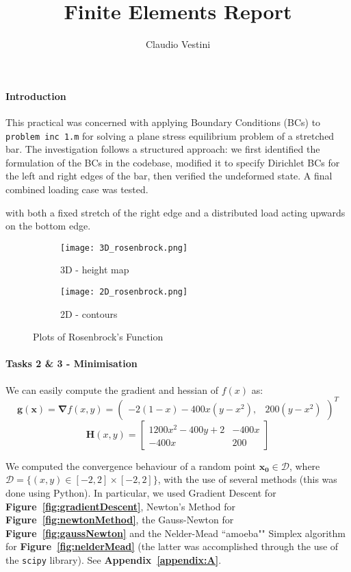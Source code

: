 \documentclass[hidelinks]{article}
\title{\vspace{-1cm} Finite Elements Report}
\author{\vspace{-2cm} Claudio Vestini}
\date{}
\begin{document}
\maketitle
%
\paragraph{Introduction}
This practical was concerned with applying Boundary Conditions (BCs) to \texttt{problem inc 1.m} for solving a plane stress equilibrium problem of a stretched bar.
The investigation follows a structured approach: we first identified the formulation of the BCs in the codebase, modified it to specify Dirichlet BCs for the left and right edges of the bar, then verified the undeformed state. A final combined loading case was tested.






with both a fixed stretch of the right edge and a distributed load acting upwards on the bottom edge.
%
\begin{figure}[h]
    \centering
    \begin{subfigure}[t]{0.49\textwidth}
        \centering
        \texttt{[image: 3D\_rosenbrock.png]}
        \caption{3D - height map}
        \label{fig:3Drosenbrock}
    \end{subfigure}
    \hfill
    \begin{subfigure}[t]{0.49\textwidth}
        \centering
        \texttt{[image: 2D\_rosenbrock.png]}
        \caption{2D - contours}
        \label{fig:2Drosenbrock}
    \end{subfigure}
    \caption{Plots of Rosenbrock's Function}
    \label{fig:functionPlots}
\end{figure}
%
\paragraph{Tasks 2 \& 3 - Minimisation}
We can easily compute the gradient and hessian of $f(x)$ as:
\[
\mathbf{g(\mathbf{x})} = \boldsymbol{\nabla} f(x, y) = 
\begin{pmatrix}
-2(1 - x) - 400x(y - x^2), & 200(y - x^2)
\end{pmatrix}^{T}
\]
\[
\mathbf{H}(x, y) =
\begin{bmatrix}
1200x^2 - 400y + 2 & -400x \\
-400x & 200
\end{bmatrix}
\]
\par We computed the convergence behaviour of a random point $\mathbf{x_0} \in \mathcal{D}$, where $\mathcal{D} = \{ (x, y) \in [-2, 2] \times [-2, 2] \}$, with the use of several methods (this was done using Python). In particular, we used Gradient Descent for \textbf{Figure~\ref{fig:gradientDescent}}, Newton's Method for \textbf{Figure~\ref{fig:newtonMethod}}, the Gauss-Newton for \textbf{Figure~\ref{fig:gaussNewton}} and the Nelder-Mead ``amoeba"" Simplex algorithm for \textbf{Figure~\ref{fig:nelderMead}} (the latter was accomplished through the use of the \texttt{scipy} library). See \textbf{Appendix~\ref{appendix:A}}.
\end{document}

